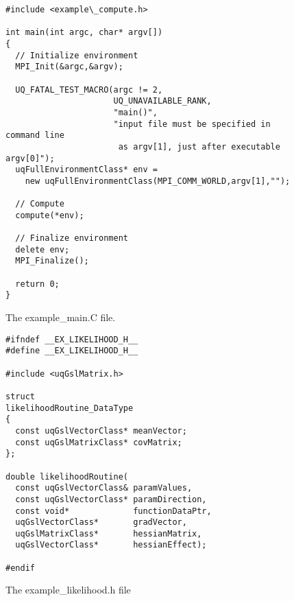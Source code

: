 \begin{figure}[h!]
\begin{center}
\begin{verbatim}
#include <example\_compute.h>

int main(int argc, char* argv[])
{
  // Initialize environment
  MPI_Init(&argc,&argv);

  UQ_FATAL_TEST_MACRO(argc != 2,
                      UQ_UNAVAILABLE_RANK,
                      "main()",
                      "input file must be specified in command line
                       as argv[1], just after executable argv[0]");
  uqFullEnvironmentClass* env =
    new uqFullEnvironmentClass(MPI_COMM_WORLD,argv[1],"");

  // Compute
  compute(*env);

  // Finalize environment
  delete env;
  MPI_Finalize();

  return 0;
}
\end{verbatim}
\end{center}
\caption{
The example\_main.C file.
}
\label{fig-main-c}
\end{figure}

\begin{figure}[h!]
\begin{center}
\begin{verbatim}
#ifndef __EX_LIKELIHOOD_H__
#define __EX_LIKELIHOOD_H__

#include <uqGslMatrix.h>

struct
likelihoodRoutine_DataType
{
  const uqGslVectorClass* meanVector;
  const uqGslMatrixClass* covMatrix;
};

double likelihoodRoutine(
  const uqGslVectorClass& paramValues,
  const uqGslVectorClass* paramDirection,
  const void*             functionDataPtr,
  uqGslVectorClass*       gradVector,
  uqGslMatrixClass*       hessianMatrix,
  uqGslVectorClass*       hessianEffect);

#endif
\end{verbatim}
\end{center}
\caption{
The example\_likelihood.h file
}
\label{fig-like-h}
\end{figure}

